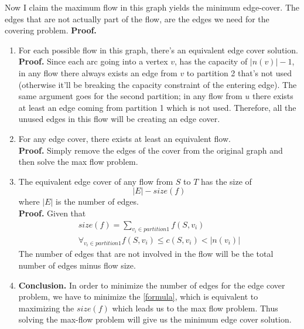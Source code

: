 \documentclass[letterpaper,12pt]{article}
\begin{document}
\begin{enumerate}
Now I claim the maximum flow in this graph yields the minimum edge-cover. The edges that are not actually part of the flow, are the edges we need for the covering problem.
\textbf{Proof.}
\begin{enumerate}
	\item \label{pa} For each possible flow in this graph, there's an equivalent edge cover solution.\\
	\textbf{Proof.} Since each arc going into a vertex $v$, has the capacity of $|n(v)|-1$, in any flow there always exists an edge from $v$ to partition 2 that's not used (otherwise it'll be breaking the capacity constraint of the entering edge). The same argument goes for the second partition; in any flow from $u$ there exists at least an edge coming from partition 1 which is not used. Therefore, all the unused edges in this flow will be creating an edge cover.
	\item \label{pb} For any edge cover, there exists at least an equivalent flow.\\
	\textbf{Proof.} Simply remove the edges of the cover from the original graph and then solve the max flow problem.
	\item \label{pc} The equivalent edge cover of any flow from $S$ to $T$ has the size of
	\begin{equation}
		|E| - size(f)
		\label{formula}
	\end{equation}
	where $|E|$ is the number of edges.\\
	\textbf{Proof.} Given that
	\begin{gather}
		size(f) = \sum_{v_i \in partition 1} f(S, v_i)\\
		\forall_{v_i \in partition 1} f(S, v_i) \leq c(S, v_i) < |n(v_i)|
	\end{gather}
	The number of edges that are not involved in the flow will be the total number of edges minus flow size.
	\item \textbf{Conclusion.} In order to minimize the number of edges for the edge cover problem, we have to minimize the \ref{formula}, which is equivalent to maximizing the $size(f)$ which leads us to the max flow problem. Thus solving the max-flow problem will give us the minimum edge cover solution.
\end{enumerate}


\end{enumerate}
\end{document}
